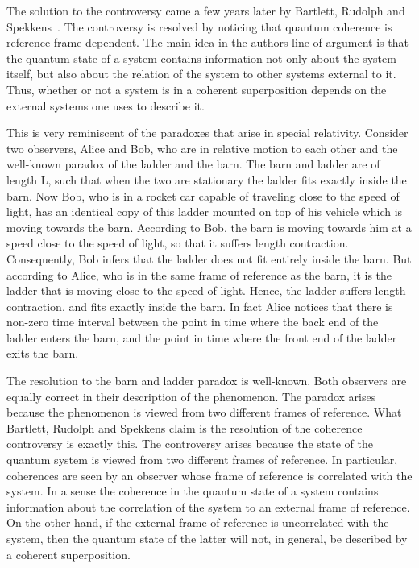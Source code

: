 \documentclass{article}
\begin{document}
The solution to the controversy came a few years later by Bartlett, Rudolph and Spekkens~\cite{BRS06}.  The controversy is resolved by noticing that quantum coherence is reference frame dependent.  The main idea in the authors line of argument is that the quantum state of a system contains information not only about the system itself, but also about the relation of the system to other systems external to it.  Thus, whether or not a system is in a coherent superposition depends on the external systems one uses to describe it.

This is very reminiscent of the paradoxes that arise in special relativity.  Consider two observers, Alice and Bob, who are in relative motion to each other and the well-known paradox of the ladder and the barn.  The barn and ladder are of length L, such that when the two are stationary the ladder fits exactly inside the barn.  Now Bob, who is in a rocket car capable of traveling close to the speed of light, has an identical copy of this ladder mounted on top of his vehicle which is moving towards the barn.  According to Bob, the barn is moving towards him at a speed close to the speed of light, so that it suffers length contraction.  Consequently, Bob infers that the ladder does not fit entirely inside the barn.  But according to Alice, who is in the same frame of reference as the barn, it is the ladder that is moving close to the speed of light.  Hence, the ladder suffers length contraction, and fits exactly inside the barn.  In fact Alice notices that there is non-zero time interval between the point in time where the back end of the ladder enters the barn, and the point in time where the front end of the ladder exits the barn.  

The resolution to the barn and ladder paradox is well-known.  Both observers are equally correct in their description of the phenomenon.  The paradox arises because the phenomenon is viewed from two different frames of reference.   What Bartlett, Rudolph and Spekkens claim is the resolution of the coherence controversy is exactly this.  The controversy arises because the state of the quantum system is viewed from two different frames of reference.  In particular, coherences are seen by an observer whose frame of reference is correlated with the system.  In a sense the coherence in the quantum state of a system contains information about the correlation of the system to an external frame of reference.  On the other hand, if the external frame of reference is uncorrelated with the system, then the quantum state of the latter will not, in general, be described by a coherent superposition. 
\end{document}

